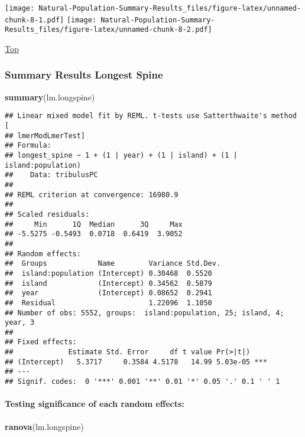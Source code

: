 \documentclass[
]{article}
\newenvironment{Shaded}{\begin{snugshade}}{\end{snugshade}}
\newcommand{\KeywordTok}[1]{\textcolor[rgb]{0.13,0.29,0.53}{\textbf{#1}}}
\newcommand{\NormalTok}[1]{#1}
\begin{document}
\texttt{[image: Natural-Population-Summary-Results\_files/figure-latex/unnamed-chunk-8-1.pdf]}
\texttt{[image: Natural-Population-Summary-Results\_files/figure-latex/unnamed-chunk-8-2.pdf]}

\protect\hyperlink{generalized-linear-model}{Top}

\hypertarget{summary-results-longest-spine}{%
\subsubsection{Summary Results Longest
Spine}\label{summary-results-longest-spine}}

\begin{Shaded}
\begin{Highlighting}[]
\KeywordTok{summary}\NormalTok{(lm.longspine)}
\end{Highlighting}
\end{Shaded}

\begin{verbatim}
## Linear mixed model fit by REML. t-tests use Satterthwaite's method [
## lmerModLmerTest]
## Formula: 
## longest_spine ~ 1 + (1 | year) + (1 | island) + (1 | island:population)
##    Data: tribulusPC
## 
## REML criterion at convergence: 16980.9
## 
## Scaled residuals: 
##     Min      1Q  Median      3Q     Max 
## -5.5275 -0.5493  0.0718  0.6419  3.9052 
## 
## Random effects:
##  Groups            Name        Variance Std.Dev.
##  island:population (Intercept) 0.30468  0.5520  
##  island            (Intercept) 0.34562  0.5879  
##  year              (Intercept) 0.08652  0.2941  
##  Residual                      1.22096  1.1050  
## Number of obs: 5552, groups:  island:population, 25; island, 4; year, 3
## 
## Fixed effects:
##             Estimate Std. Error     df t value Pr(>|t|)    
## (Intercept)   5.3717     0.3584 4.5178   14.99 5.03e-05 ***
## ---
## Signif. codes:  0 '***' 0.001 '**' 0.01 '*' 0.05 '.' 0.1 ' ' 1
\end{verbatim}

\hypertarget{testing-significance-of-each-random-effects-3}{%
\paragraph{Testing significance of each random
effects:}\label{testing-significance-of-each-random-effects-3}}

\begin{Shaded}
\begin{Highlighting}[]
\KeywordTok{ranova}\NormalTok{(lm.longspine)}
\end{Highlighting}
\end{Shaded}
\end{document}
